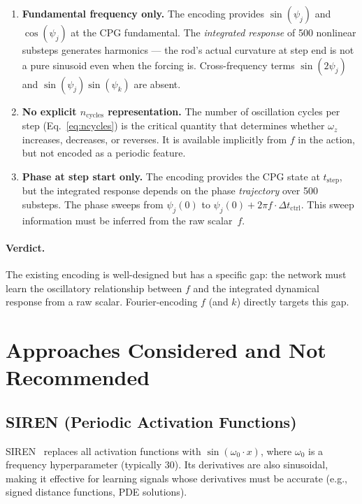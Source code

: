 \documentclass[11pt]{article}
\begin{document}
\begin{enumerate}[label=(\alph*)]
  \item \textbf{Fundamental frequency only.}
    The encoding provides $\sin(\psi_j)$ and $\cos(\psi_j)$ at the CPG fundamental.
    The \emph{integrated response} of 500 nonlinear substeps generates harmonics ---
    the rod's actual curvature at step end is not a pure sinusoid even when the
    forcing is.
    Cross-frequency terms $\sin(2\psi_j)$ and $\sin(\psi_j)\sin(\psi_k)$ are absent.

  \item \textbf{No explicit $n_{\mathrm{cycles}}$ representation.}
    The number of oscillation cycles per step (Eq.~\ref{eq:ncycles}) is the
    critical quantity that determines whether $\omega_z$ increases, decreases, or
    reverses.
    It is available implicitly from $f$ in the action, but not encoded as a periodic feature.

  \item \textbf{Phase at step start only.}
    The encoding provides the CPG state at $t_{\mathrm{step}}$, but the integrated
    response depends on the phase \emph{trajectory} over 500 substeps.
    The phase sweeps from $\psi_j(0)$ to $\psi_j(0) + 2\pi f \cdot \Delta t_{\mathrm{ctrl}}$.
    This sweep information must be inferred from the raw scalar~$f$.
\end{enumerate}

\paragraph{Verdict.}
The existing encoding is well-designed but has a specific gap: the network must
learn the oscillatory relationship between $f$ and the integrated dynamical response
from a raw scalar.
Fourier-encoding $f$ (and $k$) directly targets this gap.

\section{Approaches Considered and Not Recommended}
\label{sec:not-recommended}

\subsection{SIREN (Periodic Activation Functions)}

SIREN~\cite{sitzmann2020siren} replaces all activation functions with
$\sin(\omega_0 \cdot x)$, where $\omega_0$ is a frequency hyperparameter
(typically 30).
Its derivatives are also sinusoidal, making it effective for learning signals
whose derivatives must be accurate (e.g., signed distance functions, PDE solutions).
\end{document}
